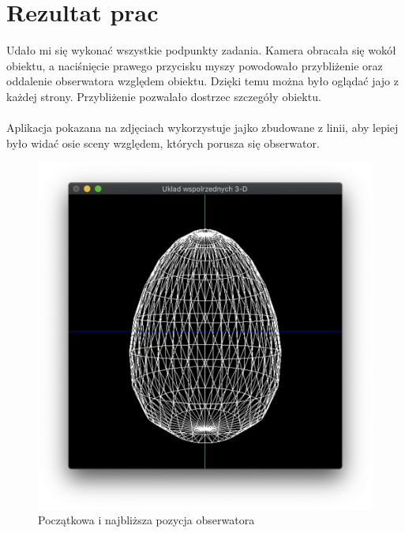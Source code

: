 \documentclass[12pt,a4paper,titlepage]{article}
\begin{document}
\section{Rezultat prac}
Udało mi się wykonać wszystkie podpunkty zadania. Kamera obracała się wokół obiektu, a naciśnięcie prawego przycisku myszy powodowało przybliżenie oraz oddalenie obserwatora względem obiektu. Dzięki temu można było oglądać jajo z każdej strony. Przybliżenie pozwalało dostrzec szczegóły obiektu.\\\\
Aplikacja pokazana na zdjęciach wykorzystuje jajko zbudowane z linii, aby lepiej było widać osie sceny względem, których porusza się obserwator.

\begin{figure}[H]
\centering
\includegraphics[width = 14cm]{images/initial.png}
\caption{Początkowa i najbliższa pozycja obserwatora}
\label{fig:egg_inital}
\end{figure}
\end{document}
